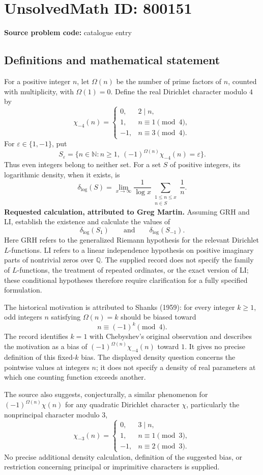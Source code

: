 \documentclass[11pt]{article}
\newcommand{\N}{\mathbb{N}}
\newcommand{\Q}{\mathbb{Q}}
\begin{document}
\section*{UnsolvedMath ID: 800151}
\textbf{Source problem code:} catalogue entry
\subsection{Definitions and mathematical statement}
For a positive integer \(n\), let \(\Omega(n)\) be the number of prime factors of \(n\), counted with multiplicity, with \(\Omega(1)=0\). Define the real Dirichlet character modulo \(4\) by
\[
\chi_{-4}(n)=\begin{cases}0,&2\mid n,\\1,&n\equiv1\pmod4,\\-1,&n\equiv3\pmod4.\end{cases}
\]
For \(\varepsilon\in\{1,-1\}\), put
\[
S_\varepsilon=\{n\in\N:n\ge1,\ (-1)^{\Omega(n)}\chi_{-4}(n)=\varepsilon\}.
\]
Thus even integers belong to neither set. For a set \(S\) of positive integers, its logarithmic density, when it exists, is
\[
\delta_{\log}(S)=\lim_{x\to\infty}\frac{1}{\log x}\sum_{\substack{1\le n\le x\\n\in S}}\frac1n.
\]
\textbf{Requested calculation, attributed to Greg Martin.} Assuming GRH and LI, establish the existence and calculate the values of
\[
\delta_{\log}(S_1)\qquad\text{and}\qquad\delta_{\log}(S_{-1}).
\]
Here GRH refers to the generalized Riemann hypothesis for the relevant Dirichlet \(L\)-functions. LI refers to a linear independence hypothesis on positive imaginary parts of nontrivial zeros over \(\Q\). The supplied record does not specify the family of \(L\)-functions, the treatment of repeated ordinates, or the exact version of LI; these conditional hypotheses therefore require clarification for a fully specified formulation.

The historical motivation is attributed to Shanks (1959): for every integer \(k\ge1\), odd integers \(n\) satisfying \(\Omega(n)=k\) should be biased toward
\[
n\equiv(-1)^k\pmod4.
\]
The record identifies \(k=1\) with Chebyshev's original observation and describes the motivation as a bias of \((-1)^{\Omega(n)}\chi_{-4}(n)\) toward \(1\). It gives no precise definition of this fixed-\(k\) bias. The displayed density question concerns the pointwise values at integers \(n\); it does not specify a density of real parameters at which one counting function exceeds another.

The source also suggests, conjecturally, a similar phenomenon for \((-1)^{\Omega(n)}\chi(n)\) for any quadratic Dirichlet character \(\chi\), particularly the nonprincipal character modulo \(3\),
\[
\chi_{-3}(n)=\begin{cases}0,&3\mid n,\\1,&n\equiv1\pmod3,\\-1,&n\equiv2\pmod3.\end{cases}
\]
No precise additional density calculation, definition of the suggested bias, or restriction concerning principal or imprimitive characters is supplied.
\end{document}
